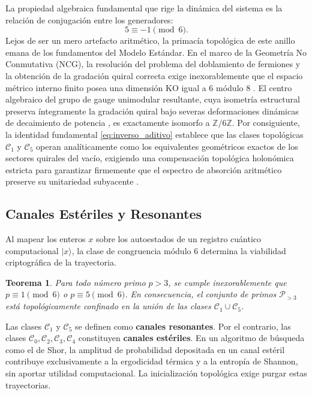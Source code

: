 \documentclass[12pt,a4paper]{article}
\theoremstyle{plain}
\newtheorem{teorema}{Teorema}[section]
\theoremstyle{definition}
\theoremstyle{remark}
\begin{document}
La propiedad algebraica fundamental que rige la dinámica del sistema es la relación de conjugación entre los generadores:
\begin{equation}
5 \equiv -1 \pmod{6}.
\label{eq:inverso_aditivo}
\end{equation}
Lejos de ser un mero artefacto aritmético, la primacía topológica de este anillo emana de los fundamentos del Modelo Estándar. En el marco de la Geometría No Conmutativa (NCG), la resolución del problema del doblamiento de fermiones y la obtención de la gradación quiral correcta exige inexorablemente que el espacio métrico interno finito posea una dimensión KO igual a 6 módulo 8 \cite{Connes2008, Peinador_Emergencia_Geometria_2025}. El centro algebraico del grupo de gauge unimodular resultante, cuya isometría estructural preserva íntegramente la gradación quiral bajo severas deformaciones dinámicas de decaimiento de potencia \cite{Peinador_Modular_Quantum_Chaos_2026}, es exactamente isomorfo a $\mathbb{Z}/6\mathbb{Z}$. Por consiguiente, la identidad fundamental \eqref{eq:inverso_aditivo} establece que las clases topológicas $\mathcal{C}_1$ y $\mathcal{C}_5$ operan analíticamente como los equivalentes geométricos exactos de los sectores quirales del vacío, exigiendo una compensación topológica holonómica estricta para garantizar firmemente que el espectro de absorción aritmético preserve su unitariedad subyacente \cite{Peinador_Dualidad_Riemann_2026, Peinador_Modular_Quantum_Chaos_2026}.

\subsection{Canales Estériles y Resonantes}

Al mapear los enteros $x$ sobre los autoestados de un registro cuántico computacional $|x\rangle$, la clase de congruencia módulo 6 determina la viabilidad criptográfica de la trayectoria. 

\begin{teorema}
Para todo número primo $p>3$, se cumple inexorablemente que $p \equiv 1 \pmod{6}$ o $p \equiv 5 \pmod{6}$. En consecuencia, el conjunto de primos $\mathcal{P}_{>3}$ está topológicamente confinado en la unión de las clases $\mathcal{C}_1 \cup \mathcal{C}_5$.
\end{teorema}

Las clases $\mathcal{C}_1$ y $\mathcal{C}_5$ se definen como \textbf{canales resonantes}. Por el contrario, las clases $\mathcal{C}_0,\mathcal{C}_2,\mathcal{C}_3,\mathcal{C}_4$ constituyen \textbf{canales estériles}. En un algoritmo de búsqueda como el de Shor, la amplitud de probabilidad depositada en un canal estéril contribuye exclusivamente a la ergodicidad térmica y a la entropía de Shannon, sin aportar utilidad computacional. La inicialización topológica exige purgar estas trayectorias.
\end{document}
